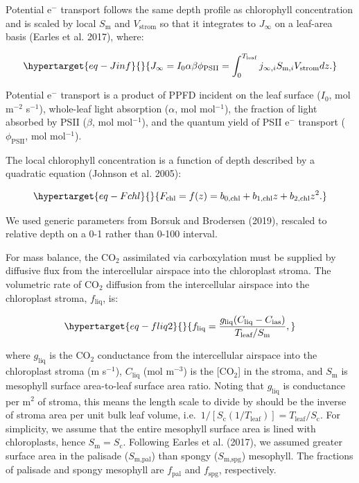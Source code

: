 \documentclass[
  letterpaper,
  DIV=11,
  numbers=noendperiod]{scrartcl}
\begin{document}
Potential e\(^{-}\) transport follows the same depth profile as
chlorophyll concentration and is scaled by local \(S_\text{m}\) and
\(V_\text{strom}\) so that it integrates to \(J_\infty\) on a leaf-area
basis (Earles et al. 2017), where:

\begin{equation}\protect\hypertarget{eq-Jinf}{}{ J_\infty = I_0 \alpha \beta \phi_\text{PSII} = \int_0^{T_\text{leaf}} j_{\infty,i} S_{\text{m},i} V_\text{strom} dz.}\label{eq-Jinf}\end{equation}

Potential e\(^{-}\) transport is a product of PPFD incident on the leaf
surface (\(I_0\), mol m\(^{-2}\) s\(^{-1}\)), whole-leaf light
absorption (\(\alpha\), mol mol\(^{-1}\)), the fraction of light
absorbed by PSII (\(\beta\), mol mol\(^{-1}\)), and the quantum yield of
PSII e\(^{-}\) transport (\(\phi_\text{PSII}\), mol mol\(^{-1}\)).

The local chlorophyll concentration is a function of depth described by
a quadratic equation (Johnson et al. 2005):

\begin{equation}\protect\hypertarget{eq-Fchl}{}{F_\text{chl} = f(z) = b_{0,\text{chl}} + b_{1,\text{chl}} z + b_{2,\text{chl}} z ^ 2.}\label{eq-Fchl}\end{equation}

We used generic parameters from Borsuk and Brodersen (2019), rescaled to
relative depth on a 0-1 rather than 0-100 interval.

For mass balance, the CO\(_2\) assimilated via carboxylation must be
supplied by diffusive flux from the intercellular airspace into the
chloroplast stroma. The volumetric rate of CO\(_2\) diffusion from the
intercellular airspace into the chloroplast stroma, \(f_\text{liq}\),
is:

\begin{equation}\protect\hypertarget{eq-fliq2}{}{f_\text{liq} = \frac{g_\text{liq} (C_\text{liq} - C_\text{ias})}{T_\text{leaf} / S_\text{m}},}\label{eq-fliq2}\end{equation}

where \(g_\text{liq}\) is the CO\(_2\) conductance from the
intercellular airspace into the chloroplast stroma (m s\(^{-1}\)),
\(C_\text{liq}\) (mol m\(^{-3}\)) is the {[}CO\(_2\){]} in the stroma,
and \(S_\text{m}\) is mesophyll surface area-to-leaf surface area ratio.
Noting that \(g_\text{liq}\) is conductance per m\(^2\) of stroma, this
means the length scale to divide by should be the inverse of stroma area
per unit bulk leaf volume,
i.e.~\(1/[S_\text{c} (1 / T_\text{leaf})] = T_\text{leaf} / S_\text{c}\).
For simplicity, we assume that the entire mesophyll surface area is
lined with chloroplasts, hence \(S_\text{m} = S_\text{c}\). Following
Earles et al. (2017), we assumed greater surface area in the palisade
(\(S_\text{m,pal}\)) than spongy (\(S_\text{m,spg}\)) mesophyll. The
fractions of palisade and spongy mesophyll are \(f_\text{pal}\) and
\(f_\text{spg}\), respectively.
\end{document}
